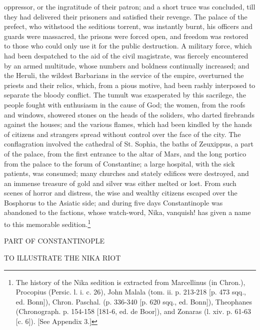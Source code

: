 oppressor, or the ingratitude of their patron; and a short truce was concluded, till they had delivered their prisoners and satisfied their revenge. The palace of the prefect, who withstood the seditious torrent, was instantly burnt, his officers and guards were massacred, the prisons were forced open, and freedom was restored to those who could only use it for the public destruction. A military force, which had been despatched to the aid of the civil magistrate, was fiercely encountered by an armed multitude, whose numbers and boldness continually increased; and the Heruli, the wildest Barbarians in the service of the empire, overturned the priests and their relics, which, from a pious motive, had been rashly interposed to separate the bloody conflict. The tumult was exasperated by this sacrilege, the people fought with enthusiasm in the cause of God; the women, from the roofs and windows, showered stones on the heads of the soliders, who darted firebrands against the houses; and the various flames, which had been kindled by the hands of citizens and strangers spread without control over the face of the city. The conflagration involved the cathedral of St. Sophia, the baths of Zeuxippus, a part of the palace, from the first entrance to the altar of Mars, and the long portico from the palace to the forum of Constantine; a large hospital, with the sick patients, was consumed; many churches and stately edifices were destroyed, and an immense treasure of gold and silver was either melted or lost. From such scenes of horror and distress, the wise and wealthy citizens escaped over the Bosphorus to the Asiatic side; and during five days Constantinople was abandoned to the factions, whose watch-word, Nika, vanquish! has given a name to this memorable sedition.\footnote{The history of the Nika sedition is extracted from Marcellinus (in Chron.), Procopius (Persic. l. i. c. 26), John Malala (tom. ii. p. 213-218 [p. 473 sqq., ed. Bonn]), Chron. Paschal. (p. 336-340 [p. 620 sqq., ed. Bonn]), Theophanes (Chronograph. p. 154-158 [181-6, ed. de Boor]), and Zonaras (l. xiv. p. 61-63 [c. 6]). [See Appendix 3.]}

PART OF CONSTANTINOPLE

TO ILLUSTRATE THE NIKA RIOT

